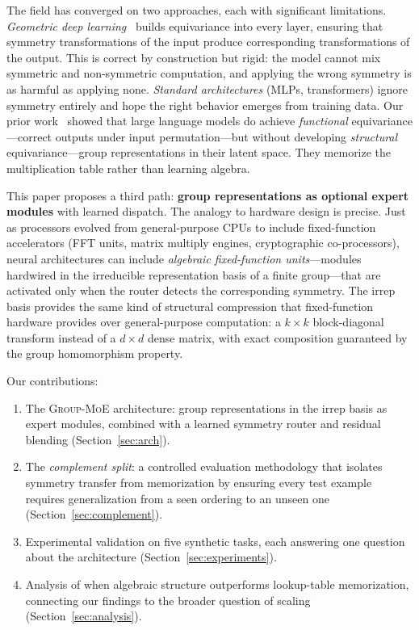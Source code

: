 \documentclass[10pt, letterpaper]{article}
\newcommand{\gmoe}{\textsc{Group-MoE}}
\begin{document}
The field has converged on two approaches, each with significant limitations. \emph{Geometric deep learning}~\cite{bronstein2021geometric, cohen2016group} builds equivariance into every layer, ensuring that symmetry transformations of the input produce corresponding transformations of the output. This is correct by construction but rigid: the model cannot mix symmetric and non-symmetric computation, and applying the wrong symmetry is as harmful as applying none. \emph{Standard architectures} (MLPs, transformers) ignore symmetry entirely and hope the right behavior emerges from training data. Our prior work~\cite{walters2025ordering} showed that large language models do achieve \emph{functional} equivariance---correct outputs under input permutation---but without developing \emph{structural} equivariance---group representations in their latent space. They memorize the multiplication table rather than learning algebra.

This paper proposes a third path: \textbf{group representations as optional expert modules} with learned dispatch. The analogy to hardware design is precise. Just as processors evolved from general-purpose CPUs to include fixed-function accelerators (FFT units, matrix multiply engines, cryptographic co-processors), neural architectures can include \emph{algebraic fixed-function units}---modules hardwired in the irreducible representation basis of a finite group---that are activated only when the router detects the corresponding symmetry. The irrep basis provides the same kind of structural compression that fixed-function hardware provides over general-purpose computation: a $k \times k$ block-diagonal transform instead of a $d \times d$ dense matrix, with exact composition guaranteed by the group homomorphism property.

Our contributions:
\begin{enumerate}[leftmargin=*]
    \item The \gmoe{} architecture: group representations in the irrep basis as expert modules, combined with a learned symmetry router and residual blending (Section~\ref{sec:arch}).
    \item The \emph{complement split}: a controlled evaluation methodology that isolates symmetry transfer from memorization by ensuring every test example requires generalization from a seen ordering to an unseen one (Section~\ref{sec:complement}).
    \item Experimental validation on five synthetic tasks, each answering one question about the architecture (Section~\ref{sec:experiments}).
    \item Analysis of when algebraic structure outperforms lookup-table memorization, connecting our findings to the broader question of scaling (Section~\ref{sec:analysis}).
\end{enumerate}
\end{document}
